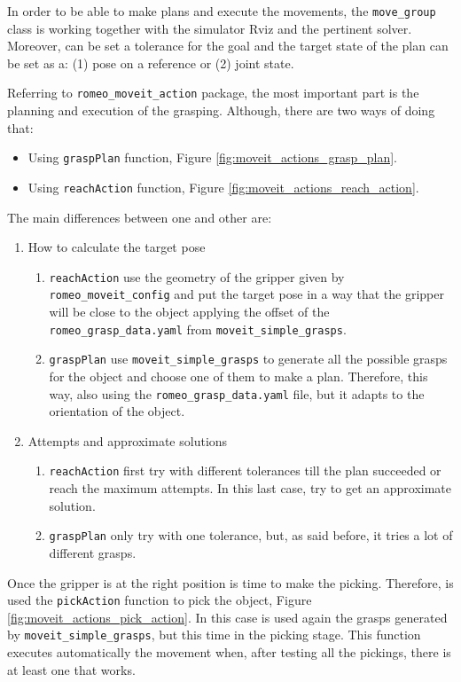 \documentclass[12pt,a4paper,final,twoside,openright]{report}
\begin{document}
In order to be able to make plans and execute the movements, the \texttt{move\_group} class is working together with the simulator Rviz and the pertinent solver. Moreover, can be set a tolerance for the goal and the target state of the plan can be set as a: (1) pose on a reference or (2) joint state.

Referring to \texttt{romeo\_moveit\_action} package, the most important part is the planning and execution of the grasping. Although, there are two ways of doing that: 

\begin{itemize}
\item Using \texttt{graspPlan} function, Figure \ref{fig:moveit_actions_grasp_plan}.
\item Using \texttt{reachAction} function, Figure \ref{fig:moveit_actions_reach_action}.
\end{itemize}

The main differences between one and other are: 
\begin{enumerate}
\item How to calculate the target pose 
\begin{enumerate}
\item \texttt{reachAction} use the geometry of the gripper given by \texttt{romeo\_moveit\_config} and put the target pose in a way that the gripper will be close to the object applying the offset of the \texttt{romeo\_grasp\_data.yaml} from \texttt{moveit\_simple\_grasps}. 
\item \texttt{graspPlan} use \texttt{moveit\_simple\_grasps} to generate all the possible grasps for the object and choose one of them to make a plan. Therefore, this way, also using the \texttt{romeo\_grasp\_data.yaml} file, but it adapts to the orientation of the object. 
\end{enumerate}

\item Attempts and approximate solutions
\begin{enumerate}
\item \texttt{reachAction} first try with different tolerances till the plan succeeded or reach the maximum attempts. In this last case, try to get an approximate solution.
\item \texttt{graspPlan} only try with one tolerance, but, as said before, it tries a lot of different grasps.
\end{enumerate}
\end{enumerate}

Once the gripper is at the right position is time to make the picking. Therefore, is used the \texttt{pickAction} function to pick the object, Figure \ref{fig:moveit_actions_pick_action}. In this case is used again the grasps generated by \texttt{moveit\_simple\_grasps}, but this time in the picking stage. This function executes automatically the movement when, after testing all the pickings, there is at least one that works.
\end{document}
